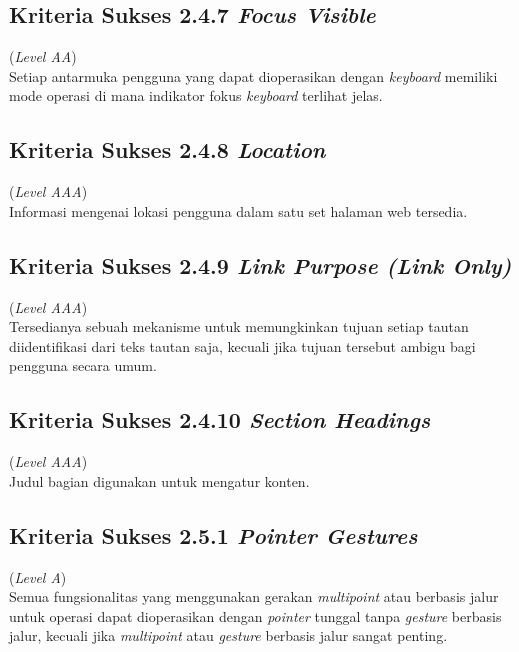 \subsection{Kriteria Sukses 2.4.7 \textit{Focus Visible}}
\label{subsec:kriteria_2.4.7}
(\textit{Level AA}) \\

Setiap antarmuka pengguna yang dapat dioperasikan dengan \textit{keyboard} memiliki mode operasi di mana indikator fokus \textit{keyboard} terlihat jelas.

\subsection{Kriteria Sukses 2.4.8 \textit{Location}}
\label{subsec:kriteria_2.4.8}
(\textit{Level AAA}) \\

Informasi mengenai lokasi pengguna dalam satu set halaman web tersedia.

\subsection{Kriteria Sukses 2.4.9 \textit{Link Purpose (Link Only)}}
\label{subsec:kriteria_2.4.9}
(\textit{Level AAA}) \\

Tersedianya sebuah mekanisme untuk memungkinkan tujuan setiap tautan diidentifikasi dari teks tautan saja, kecuali jika tujuan tersebut ambigu bagi pengguna secara umum.

\subsection{Kriteria Sukses 2.4.10 \textit{Section Headings}}
\label{subsec:kriteria_2.4.10}
(\textit{Level AAA}) \\

Judul bagian digunakan untuk mengatur konten.

\subsection{Kriteria Sukses 2.5.1 \textit{Pointer Gestures}}
\label{subsec:kriteria_2.5.1}
(\textit{Level A}) \\

Semua fungsionalitas yang menggunakan gerakan \textit{multipoint} atau berbasis jalur untuk operasi dapat dioperasikan dengan \textit{pointer} tunggal tanpa \textit{gesture} berbasis jalur, kecuali jika \textit{multipoint} atau \textit{gesture} berbasis jalur sangat penting.

